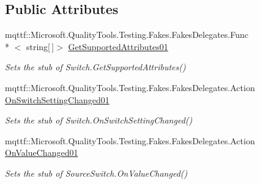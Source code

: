 \subsection*{Public Attributes}
\begin{DoxyCompactItemize}
\item 
mqttf\-::\-Microsoft.\-Quality\-Tools.\-Testing.\-Fakes.\-Fakes\-Delegates.\-Func\\*
$<$ string\mbox{[}$\,$\mbox{]}$>$ \hyperlink{class_system_1_1_diagnostics_1_1_fakes_1_1_stub_source_switch_a9859ca6f55fe065f4f451b33e363fd44}{Get\-Supported\-Attributes01}
\begin{DoxyCompactList}\small\item\em Sets the stub of Switch.\-Get\-Supported\-Attributes()\end{DoxyCompactList}\item 
mqttf\-::\-Microsoft.\-Quality\-Tools.\-Testing.\-Fakes.\-Fakes\-Delegates.\-Action \hyperlink{class_system_1_1_diagnostics_1_1_fakes_1_1_stub_source_switch_a9a243c56379b2f9f0bce61f77bf97573}{On\-Switch\-Setting\-Changed01}
\begin{DoxyCompactList}\small\item\em Sets the stub of Switch.\-On\-Switch\-Setting\-Changed()\end{DoxyCompactList}\item 
mqttf\-::\-Microsoft.\-Quality\-Tools.\-Testing.\-Fakes.\-Fakes\-Delegates.\-Action \hyperlink{class_system_1_1_diagnostics_1_1_fakes_1_1_stub_source_switch_accf5b874ee08ae6177f2a9a5ed2c1082}{On\-Value\-Changed01}
\begin{DoxyCompactList}\small\item\em Sets the stub of Source\-Switch.\-On\-Value\-Changed()\end{DoxyCompactList}\end{DoxyCompactItemize}
